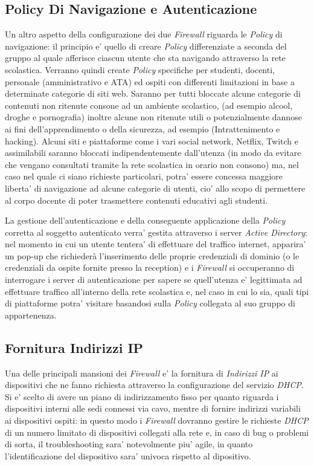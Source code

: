 \documentclass{report}
\begin{document}
			\subsection{Policy Di Navigazione e Autenticazione}
				Un altro aspetto della configurazione dei due \emph{Firewall} riguarda le \emph{Policy} di navigazione: il
				principio e' quello di creare \emph{Policy} differenziate a seconda del gruppo al quale afferisce ciascun utente 
				che sta navigando attraverso la rete scolastica. Verranno quindi create \emph{Policy} specifiche per studenti,
				docenti, personale (amministrativo e ATA) ed ospiti con differenti limitazioni in base a determinate categorie
				di siti web. Saranno per tutti bloccate alcune categorie di contenuti non ritenute consone ad un ambiente
				scolastico, (ad esempio alcool, droghe e pornografia) inoltre alcune non ritenute utili o potenzialmente
				dannose ai fini dell'apprendimento o della sicurezza, ad esempio (Intrattenimento e hacking).
				Alcuni siti e piattaforme come i vari social network, Netflix, Twitch e assimilabili saranno bloccati
				indipendentemente dall'utenza (in modo da evitare che vengano consultati tramite la rete scolastica in orario
				non consono) ma, nel caso nel quale ci siano richieste particolari, potra' essere concessa maggiore liberta' di
				navigazione ad alcune categorie di utenti, cio' allo scopo di permettere al corpo docente di poter trasmettere
				contenuti educativi agli studenti.

				La gestione dell’autenticazione e della conseguente applicazione della \emph{Policy} corretta al soggetto
				autenticato verra' gestita attraverso i server \emph{Active Directory}: nel momento in cui un utente tentera'
				di effettuare del traffico internet, apparira' un pop-up che richiederà l’inserimento delle proprie
				credenziali di dominio (o le credenziali da ospite fornite presso la reception) e i \emph{Firewall}
				si occuperanno di interrogare i server di autenticazione per sapere se quell’utenza e' legittimata
				ad effettuare traffico all’interno della rete scolastica e, nel caso in cui lo sia, quali tipi di
				piattaforme potra' visitare basandosi sulla \emph{Policy} collegata al suo gruppo di
				appartenenza.
			\subsection{Fornitura Indirizzi IP}
				Una delle principali mansioni dei \emph{Firewall} e' la fornitura di \emph{Indirizzi IP} ai dispositivi che ne
				fanno richiesta attraverso la configurazione del servizio \emph{DHCP}. Si e' scelto di avere un piano di
				indirizzamento fisso per quanto riguarda i dispositivi interni alle sedi connessi via cavo, mentre di
				fornire indirizzi variabili ai dispositivi ospiti: in questo modo i \emph{Firewall} dovranno gestire le
				richieste \emph{DHCP} di un numero limitato di dispositivi collegati alla rete e, in caso di bug o
				problemi di sorta, il troubleshooting sara' notevolmente piu' agile, in quanto l'identificazione
				del dispositivo sara' univoca rispetto al dipositivo.
\end{document}
